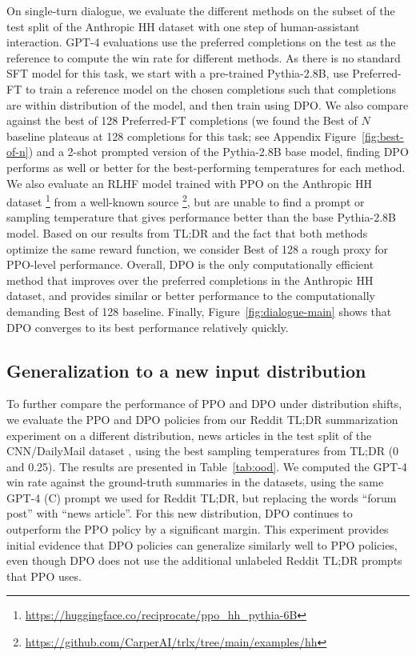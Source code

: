On single-turn dialogue, we evaluate the different methods on the subset of the test split of the Anthropic HH dataset \citep{bai2022training} with one step of human-assistant interaction. GPT-4 evaluations use the preferred completions on the test as the reference to compute the win rate for different methods. As there is no standard SFT model for this task, we start with a pre-trained Pythia-2.8B, use Preferred-FT to train a reference model on the chosen completions such that completions are within distribution of the model, and then train using DPO. We also compare against the best of 128 Preferred-FT completions (we found the Best of $N$ baseline plateaus at 128 completions for this task; see Appendix Figure~\ref{fig:best-of-n}) and a 2-shot prompted version of the Pythia-2.8B base model, finding DPO performs as well or better for the best-performing temperatures for each method. We also evaluate an RLHF model trained with PPO on the Anthropic HH dataset \footnote{\url{https://huggingface.co/reciprocate/ppo_hh_pythia-6B}} from a well-known source \footnote{\url{https://github.com/CarperAI/trlx/tree/main/examples/hh}}, but are unable to find a prompt or sampling temperature that gives performance better than the base Pythia-2.8B model. Based on our results from TL;DR and the fact that both methods optimize the same reward function, we consider Best of 128 a rough proxy for PPO-level performance. Overall, DPO is the only computationally efficient method that improves over the preferred completions in the Anthropic HH dataset, and provides similar or better performance to the computationally demanding Best of 128 baseline. Finally, Figure~\ref{fig:dialogue-main} shows that DPO converges to its best performance relatively quickly.

\subsection{Generalization to a new input distribution}

To further compare the performance of PPO and DPO under distribution shifts, we evaluate the PPO and DPO policies from our Reddit TL;DR summarization experiment on a different distribution, news articles in the test split of the CNN/DailyMail dataset \citep{nallapati-etal-2016-abstractive}, using the best sampling temperatures from TL;DR (0 and 0.25). The results are presented in Table~\ref{tab:ood}. We computed the GPT-4 win rate against the ground-truth summaries in the datasets, using the same GPT-4 (C) prompt we used for Reddit TL;DR, but replacing the words ``forum post'' with ``news article''. For this new distribution, DPO continues to outperform the PPO policy by a significant margin. This experiment provides initial evidence that DPO policies can generalize similarly well to PPO policies, even though DPO does not use the additional unlabeled Reddit TL;DR prompts that PPO uses.

